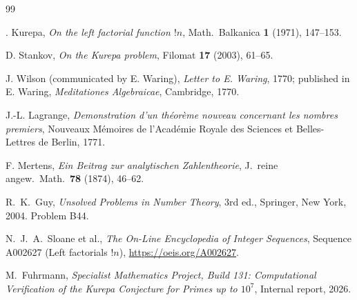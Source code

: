 \documentclass[12pt,a4paper]{amsart}
\theoremstyle{definition}
\begin{document}
\begin{thebibliography}{99}

\DJ{}. Kurepa,
\textit{On the left factorial function $!n$},
Math.\ Balkanica \textbf{1} (1971), 147--153.

D. Stankov,
\textit{On the Kurepa problem},
Filomat \textbf{17} (2003), 61--65.

J. Wilson (communicated by E. Waring),
\textit{Letter to E. Waring},
1770; published in E. Waring, \textit{Meditationes Algebraicae},
Cambridge, 1770.

J.-L. Lagrange,
\textit{Demonstration d'un th\'eor\`eme nouveau concernant les nombres premiers},
Nouveaux M\'emoires de l'Acad\'emie Royale des Sciences et Belles-Lettres de Berlin,
1771.

F. Mertens,
\textit{Ein Beitrag zur analytischen Zahlentheorie},
J.\ reine angew.\ Math.\ \textbf{78} (1874), 46--62.

R.\ K.\ Guy,
\textit{Unsolved Problems in Number Theory}, 3rd ed.,
Springer, New York, 2004.
Problem B44.

N.\ J.\ A.\ Sloane et al.,
\textit{The On-Line Encyclopedia of Integer Sequences},
Sequence A002627 (Left factorials $!n$),
\url{https://oeis.org/A002627}.

M.\ Fuhrmann,
\textit{Specialist Mathematics Project, Build 131: Computational Verification
of the Kurepa Conjecture for Primes up to $10^7$},
Internal report, 2026.

\end{thebibliography}
\end{document}
